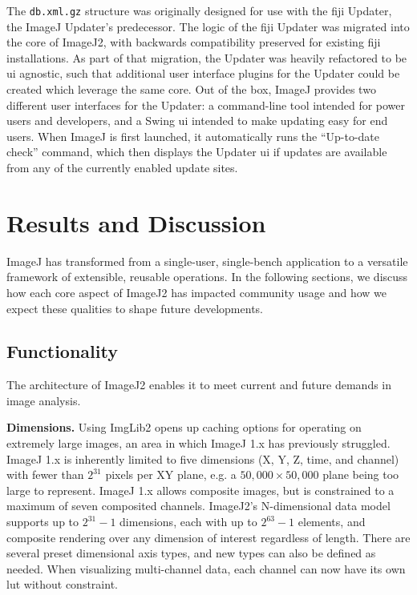 \documentclass{bmcart}
\begin{document}
The \texttt{db.xml.gz} structure was originally designed for use with the
\acrshort{fiji} Updater, the ImageJ Updater's predecessor. The logic of the
\acrshort{fiji} Updater was migrated into the core of ImageJ2, with backwards
compatibility preserved for existing \acrshort{fiji} installations. As part of
that migration, the Updater was heavily refactored to be \acrshort{ui}
agnostic, such that additional user interface plugins for the Updater could be
created which leverage the same core. Out of the box, ImageJ provides two
different user interfaces for the Updater: a command-line tool intended for
power users and developers, and a Swing \acrshort{ui} intended to make updating
easy for end users. When ImageJ is first launched, it automatically runs the
``Up-to-date check'' command, which then displays the Updater \acrshort{ui} if
updates are available from any of the currently enabled update sites.


\section*{Results and Discussion}
ImageJ has transformed from a single-user, single-bench application to a
versatile framework of extensible, reusable operations. In the following
sections, we discuss how each core aspect of ImageJ2 has impacted community
usage and how we expect these qualities to shape future developments.

\subsection*{Functionality}

The architecture of ImageJ2 enables it to meet current and future demands in
image analysis.

\textbf{Dimensions.} Using ImgLib2 opens up caching options for operating on
extremely large images, an area in which ImageJ 1.x has previously struggled.
ImageJ 1.x is inherently limited to five dimensions (X, Y, Z, time, and
channel) with fewer than $2^{31}$ pixels per XY plane, e.g. a $50,000 \times
50,000$ plane being too large to represent. ImageJ 1.x allows composite images,
but is constrained to a maximum of seven composited channels. ImageJ2's
N-dimensional data model supports up to $2^{31} - 1$ dimensions, each with up
to $2^{63} - 1$ elements, and composite rendering over any dimension of
interest regardless of length. There are several preset dimensional axis types,
and new types can also be defined as needed. When visualizing multi-channel
data, each channel can now have its own \acrshort{lut} without constraint.
\end{document}
